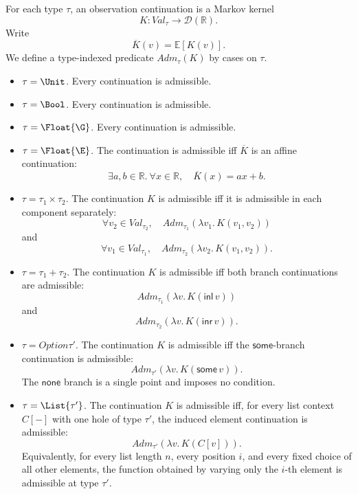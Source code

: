 \begin{definition}
  For each type $\tau$, an observation continuation is a Markov kernel
  \[
    K : Val_\tau \to \mathcal{D}(\mathbb{R}).
  \]
  Write
  \[
    \overline{K}(v) = \mathbb{E}[K(v)].
  \]
  We define a type-indexed predicate $Adm_\tau(K)$ by cases on $\tau$.

  \begin{itemize}
    \item $\tau = \Unit$. Every continuation is admissible.

    \item $\tau = \Bool$. Every continuation is admissible.

    \item $\tau = \Float{\G}$. Every continuation is admissible.

    \item $\tau = \Float{\E}$. The continuation is admissible iff
    $\overline{K}$ is an affine continuation:
    \[
      \exists a,b \in \mathbb{R}.\ \forall x \in \mathbb{R},\quad
      \overline{K}(x) = ax + b.
    \]

    \item $\tau = \tau_1 \times \tau_2$. The continuation $K$ is
    admissible iff it is admissible in each component separately:
    \[
      \forall v_2 \in Val_{\tau_2},\quad
      Adm_{\tau_1}(\lambda v_1.\,K(v_1,v_2))
    \]
    and
    \[
      \forall v_1 \in Val_{\tau_1},\quad
      Adm_{\tau_2}(\lambda v_2.\,K(v_1,v_2)).
    \]

    \item $\tau = \tau_1 + \tau_2$. The continuation $K$ is admissible iff
    both branch continuations are admissible:
    \[
      Adm_{\tau_1}(\lambda v.\,K(\mathsf{inl}\,v))
    \]
    and
    \[
      Adm_{\tau_2}(\lambda v.\,K(\mathsf{inr}\,v)).
    \]

    \item $\tau = Option{\tau'}$. The continuation $K$ is admissible iff
    the $\mathsf{some}$-branch continuation is admissible:
    \[
      Adm_{\tau'}(\lambda v.\,K(\mathsf{some}\,v)).
    \]
    The $\mathsf{none}$ branch is a single point and imposes no condition.

    \item $\tau = \List{\tau'}$. The continuation $K$ is admissible iff,
    for every list context $C[-]$ with one hole of type $\tau'$, the induced
    element continuation is admissible:
    \[
      Adm_{\tau'}(\lambda v.\,K(C[v])).
    \]
    Equivalently, for every list length $n$, every position $i$, and every
    fixed choice of all other elements, the function obtained by varying only
    the $i$-th element is admissible at type $\tau'$.


\end{itemize}
\end{definition}
